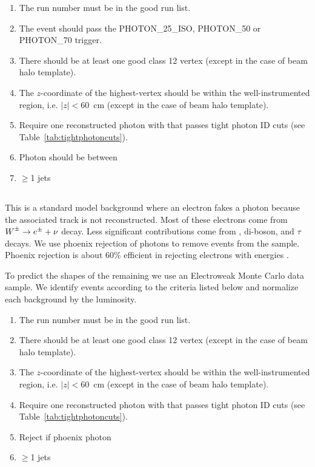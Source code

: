 \documentclass[11pt]{article}
\begin{document}
\begin{enumerate}
	\item The run number must be in the good run list.
	\item The event should pass the PHOTON\_25\_ISO, PHOTON\_50 or \mbox{PHOTON\_70} trigger. 
	\item There should be at least one good class 12 vertex (except in the case of beam halo template).
	\item The $z$-coordinate of the highest-\pt vertex should be within the well-instrumented region, i.e. \mbox{$|z|<60$~cm} (except in the case of beam halo template).
	\item Require one reconstructed photon with  that passes tight photon ID cuts (see Table~\ref{tab:tightphotoncuts}). 
	\item Photon should be between \cosmictimewindow
	\item $\geq$1 jets
\end{enumerate}


\subsection{\elejets}
This is a standard model background where an electron fakes a photon because the associated track is not reconstructed. Most of these electrons come from $\mbox{$W$}^{\pm} \rightarrow e^{\pm} +\nu$ decay. Less significant contributions come from \z, di-boson, and $\tau$ decays. We use phoenix rejection of photons to remove \elejets events from the sample. Phoenix rejection is about 60\% efficient in rejecting electrons with energies .

To predict the shapes of the remaining \elejets we use an Electroweak Monte Carlo data sample. We identify \phojets events according to the criteria listed below and normalize each background by the luminosity. 

\begin{enumerate}
	\item The run number must be in the good run list.
	\item There should be at least one good class 12 vertex (except in the case of beam halo template).
	\item The $z$-coordinate of the highest-\pt vertex should be within the well-instrumented region, i.e. \mbox{$|z|<60$~cm} (except in the case of beam halo template).
	\item Require one reconstructed photon with  that passes tight photon ID cuts (see Table~\ref{tab:tightphotoncuts}).
	\item Reject if phoenix photon 
	\item $\geq$1 jets
\end{enumerate}
\end{document}
